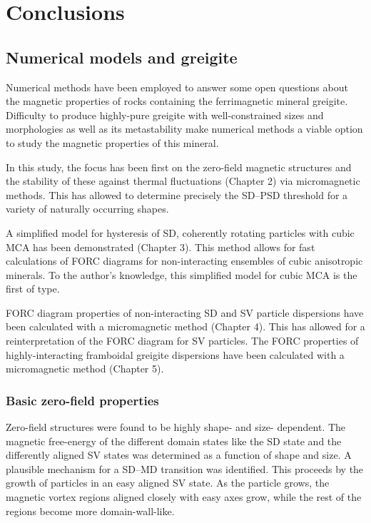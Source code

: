 \chapter{Conclusions}
\label{ch:conclusions}
\fancyhead[C]{}
\fancyhead[R]{}
\fancyfoot[C]{\thepage}

\section{Numerical models and greigite}
Numerical methods have been employed to answer some open questions about the magnetic properties of rocks containing the ferrimagnetic mineral greigite. Difficulty to produce highly-pure greigite with well-constrained sizes and morphologies as well as its metastability make numerical methods a viable option to study the magnetic properties of this mineral.\par

In this study, the focus has been first on the zero-field magnetic structures and the stability of these against thermal fluctuations (Chapter 2) via micromagnetic methods. This has allowed to determine precisely the SD--PSD threshold for a variety of naturally occurring shapes.\par

A simplified model for hysteresis of SD, coherently rotating particles with cubic MCA has been demonstrated (Chapter 3). This method allows for fast calculations of FORC diagrams for non-interacting ensembles of cubic anisotropic minerals. To the author's knowledge, this simplified model for cubic MCA is the first of type.\par

FORC diagram properties of non-interacting SD and SV particle dispersions have been calculated with a micromagnetic method (Chapter 4). This has allowed for a reinterpretation of the FORC diagram for SV particles. The FORC properties of highly-interacting framboidal greigite dispersions have been calculated with a micromagnetic method (Chapter 5).\par

\subsection{Basic zero-field properties}
Zero-field structures were found to be highly shape- and size- dependent. The magnetic free-energy of the different domain states like the SD state and the differently aligned SV states was determined as a function of shape and size. A plausible mechanism for a SD--MD transition was identified. This proceeds by the growth of particles in an easy aligned SV state. As the particle grows, the magnetic vortex regions aligned closely with easy axes grow, while the rest of the regions become more domain-wall-like.\par

